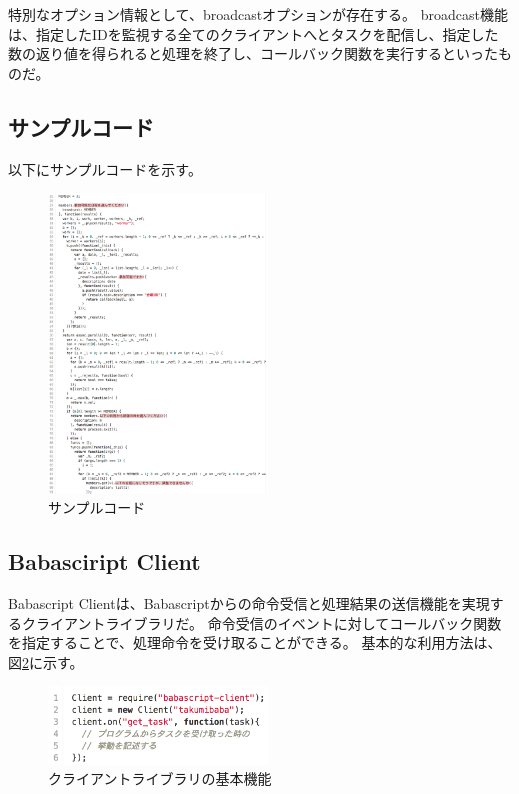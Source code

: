 特別なオプション情報として、broadcastオプションが存在する。
broadcast機能は、指定したIDを監視する全てのクライアントへとタスクを配信し、指定した数の返り値を得られると処理を終了し、コールバック関数を実行するといったものだ。

\subsection{サンプルコード}\label{ux30b5ux30f3ux30d7ux30ebux30b3ux30fcux30c9}

以下にサンプルコードを示す。

\begin{figure}[h]
  \centering  
  \includegraphics[width=220px]{./images/samplecode.png}
  \caption{サンプルコード}
  \label{script_02}
\end{figure}

\subsection{Babasciript Client}\label{babasciript-client}

Babascript
Clientは、Babascriptからの命令受信と処理結果の送信機能を実現するクライアントライブラリだ。
命令受信のイベントに対してコールバック関数を指定することで、処理命令を受け取ることができる。
基本的な利用方法は、図\ref{client}に示す。

\begin{figure}[h]
  \centering
  \includegraphics[width=220px]{./images/client.png}
  \caption{クライアントライブラリの基本機能 }
  \label{client}
\end{figure}

